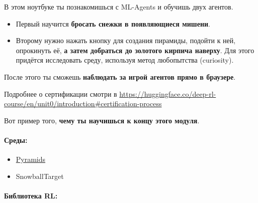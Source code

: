 \documentclass[11pt,a4paper]{article}
\begin{document}

В этом ноутбуке ты познакомишься с ML-Agents и обучишь двух агентов.

\begin{itemize}
\tightlist
\item
  Первый научится \textbf{бросать снежки в появляющиеся мишени}.
\item
  Второму нужно нажать кнопку для создания пирамиды, подойти к ней, опрокинуть её, \textbf{а затем добраться до золотого кирпича наверху}. Для этого придётся исследовать среду, используя метод любопытства (curiosity).
\end{itemize}

После этого ты сможешь \textbf{наблюдать за игрой агентов прямо в браузере}.

Подробнее о сертификации смотри в \url{https://huggingface.co/deep-rl-course/en/unit0/introduction#certification-process}

Вот пример того, \textbf{чему ты научишься к концу этого модуля}.



\paragraph{Среды:}\label{environments}

\begin{itemize}
\tightlist
\item
  \href{https://github.com/Unity-Technologies/ml-agents/blob/main/docs/Learning-Environment-Examples.md\#pyramids}{Pyramids}
\item
  SnowballTarget
\end{itemize}

\paragraph{Библиотека RL:}\label{rl-library}
\end{document}

